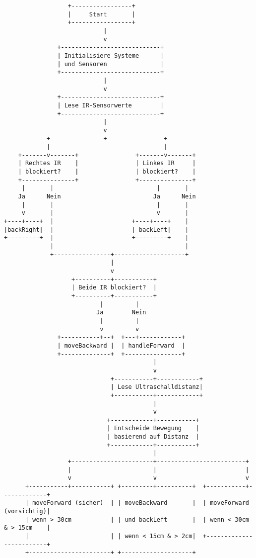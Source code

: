 \documentclass{vorlage-design-main}
\begin{document}
\begin{lstlisting}
                  +-----------------+
                  |     Start       |
                  +-----------------+
                            |
                            v
               +----------------------------+
               | Initialisiere Systeme      |
               | und Sensoren               |
               +----------------------------+
                            |
                            v
               +----------------------------+
               | Lese IR-Sensorwerte        |
               +----------------------------+
                            |
                            v
            +---------------+----------------+
            |                                |
    +-------v-------+                +-------v-------+
    | Rechtes IR    |                | Linkes IR     |
    | blockiert?    |                | blockiert?    |
    +---------------+                +---------------+
     |       |                             |       |
    Ja      Nein                          Ja      Nein
     |       |                             |       |
     v       |                             v       |
+----+----+  |                      +----+----+    |
|backRight|  |                      | backLeft|    |
+---------+  |                      +---------+    |
             |                                     |
             +----------------+--------------------+
                              |
                              v
                   +----------+-----------+
                   | Beide IR blockiert?  |
                   +----------+-----------+
                           |         |
                          Ja        Nein
                           |         |
                           v         v
               +-----------+--+  +---+------------+
               | moveBackward |  | handleForward  |
               +--------------+  +----------------+
                                          |
                                          v
                              +-----------+------------+
                              | Lese Ultraschalldistanz|
                              +-----------+------------+
                                          |
                                          v
                             +------------+-----------+
                             | Entscheide Bewegung    |
                             | basierend auf Distanz  |
                             +------------+-----------+
                                          |
                  +-----------------------+-------------------------+
                  |                       |                         |
                  v                       v                         v
      +-----------+-----------+ +---------+----------+  +-----------+-------------+
      | moveForward (sicher)  | | moveBackward       |  | moveForward (vorsichtig)|
      | wenn > 30cm           | | und backLeft       |  | wenn < 30cm & > 15cm    |
      |                       | | wenn < 15cm & > 2cm|  +-------------------------+
      +-----------------------+ +--------------------+
\end{lstlisting}
\end{document}
